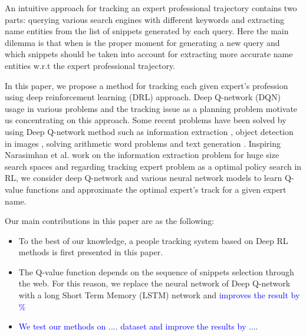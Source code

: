 \documentclass[11pt,a4paper]{article}
\newcommand{\PA}[1]{{\textcolor{blue}{#1}}}
\begin{document}
An intuitive approach for tracking an expert professional trajectory contains two parts: querying various search engines with different keywords and extracting name entities from the list of snippets generated by each query. Here the main dilemma is that when is the proper moment for generating a new query and which snippets should be taken into account for extracting more accurate name entities w.r.t the expert professional trajectory. %

In this paper, we propose a method for tracking each given expert's profession using deep reinforcement learning (DRL) approach. Deep Q-network (DQN) usage in various problems and the tracking issue as a planning problem motivate us concentrating on this approach. Some recent problems have been solved by using Deep Q-network method such as information extraction \citep{narasimhan2016improving}, object detection in images \cite{Caicedo2015}, solving arithmetic word problems \cite{wang2018} and text generation \citep{Guo2015}. Inspiring Narasimhan et al.  work on the information extraction problem for huge size search spaces and regarding tracking expert problem as a optimal policy search in RL, we consider deep Q-network and various neural network models to learn Q-value functions and approximate the optimal expert's track for a given expert name.  

Our main contributions in this paper are as the following:
\begin{itemize}
\item To the best of our knowledge, a people tracking system based on Deep RL methods is first presented in this paper.
\item The Q-value function depends on the sequence of snippets selection through the web. For this reason, we replace the neural network of Deep Q-network \cite{mnih2015} with a long Short Term Memory (LSTM) network and \PA{improves the result by \%  }
\item \PA{We test our methods on .... dataset and improve the results by .... }
\end{itemize}

\end{document}
